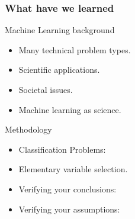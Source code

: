 \begin{frame}
  \frametitle{What have we learned}
  \begin{block}{Machine Learning background}
    \begin{itemize}
    \item Many \alert{technical} problem types.
    \item \alert{Scientific} applications.
    \item \alert{Societal} issues.
    \item Machine learning as science.
    \end{itemize}
  \end{block}

  \begin{block}{Methodology}
    \begin{itemize}
    \item \alert{Classification} Problems: 
    \item Elementary \alert{variable selection}.
    \item \alert{Verifying} your \alert{conclusions}: 
    \item Verifying your \alert{assumptions}: 
    \end{itemize}
  \end{block}
\end{frame}


